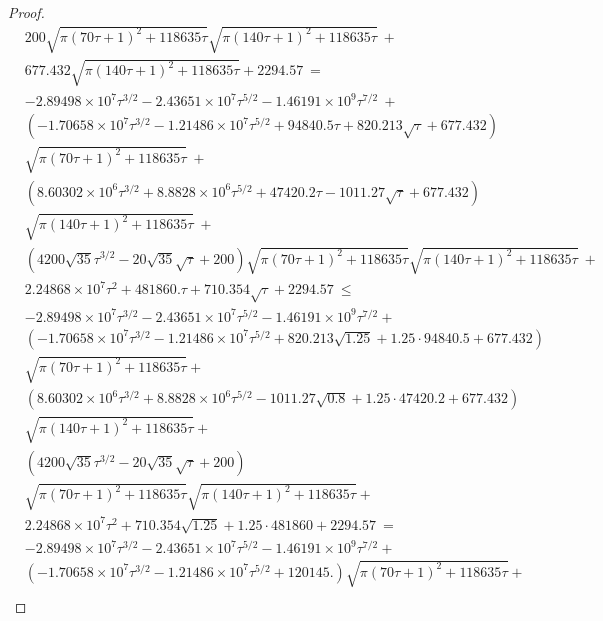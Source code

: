 \documentclass{article}
\renewcommand{\leq}{\leqslant}
\begin{document}
\begin{proof}
\begin{align}
&200 \sqrt{\pi  (70 \tau+1)^2+118635 \tau} \sqrt{\pi  (140 \tau+1)^2+118635 \tau}\ + \\ \nonumber 
&677.432 \sqrt{\pi  (140 \tau+1)^2+118635 \tau}+2294.57\ = \\ \nonumber
&-2.89498\times 10^7 \tau^{3/2}-2.43651\times 10^7 \tau^{5/2}-1.46191\times 10^9 \tau^{7/2}\ + \\ \nonumber 
&\left(-1.70658\times 10^7 \tau^{3/2}-1.21486\times 10^7 \tau^{5/2}+94840.5 \tau+820.213 \sqrt{\tau}+677.432\right) \\ \nonumber 
& \sqrt{\pi  (70 \tau+1)^2+118635 \tau}\ + \\ \nonumber 
&\left(8.60302\times 10^6 \tau^{3/2}+8.8828\times 10^6 \tau^{5/2}+47420.2 \tau-1011.27 \sqrt{\tau}+677.432\right) \\ \nonumber 
& \sqrt{\pi  (140 \tau+1)^2+118635 \tau}\ + \\ \nonumber 
&\left(4200 \sqrt{35} \tau^{3/2}-20 \sqrt{35} \sqrt{\tau}+200\right) \sqrt{\pi  (70 \tau+1)^2+118635 \tau} \sqrt{\pi  (140 \tau+1)^2+118635 \tau}\ + \\ \nonumber 
&2.24868\times 10^7 \tau^2+481860. \tau+710.354 \sqrt{\tau}+2294.57\ \leq \\ \nonumber 
&-2.89498\times 10^7 \tau^{3/2}-2.43651\times 10^7 \tau^{5/2}-1.46191\times 10^9 \tau^{7/2}+\\ \nonumber 
&\left(-1.70658\times 10^7 \tau^{3/2}-1.21486\times 10^7 \tau^{5/2}+820.213 \sqrt{1.25}+1.25 \cdot 94840.5+677.432\right)\\ \nonumber 
& \sqrt{\pi  (70 \tau+1)^2+118635 \tau}+\\ \nonumber 
&\left(8.60302\times 10^6 \tau^{3/2}+8.8828\times 10^6 \tau^{5/2}-1011.27 \sqrt{0.8}+1.25 \cdot 47420.2+677.432\right) \\ \nonumber 
&\sqrt{\pi  (140 \tau+1)^2+118635 \tau}+\\ \nonumber 
&\left(4200 \sqrt{35} \tau^{3/2}-20 \sqrt{35} \sqrt{\tau}+200\right) \\ \nonumber 
&\sqrt{\pi  (70 \tau+1)^2+118635 \tau} \sqrt{\pi  (140 \tau+1)^2+118635 \tau}+\\ \nonumber 
&2.24868\times 10^7 \tau^2+710.354 \sqrt{1.25}+1.25 \cdot 481860+2294.57\ = \\ \nonumber 
&-2.89498\times 10^7 \tau^{3/2}-2.43651\times 10^7 \tau^{5/2}-1.46191\times 10^9 \tau^{7/2}+\\ \nonumber 
&\left(-1.70658\times 10^7 \tau^{3/2}-1.21486\times 10^7 \tau^{5/2}+120145.\right) \sqrt{\pi  (70 \tau+1)^2+118635 \tau}+\\ \nonumber 

\end{align}
\end{proof}
\end{document}
